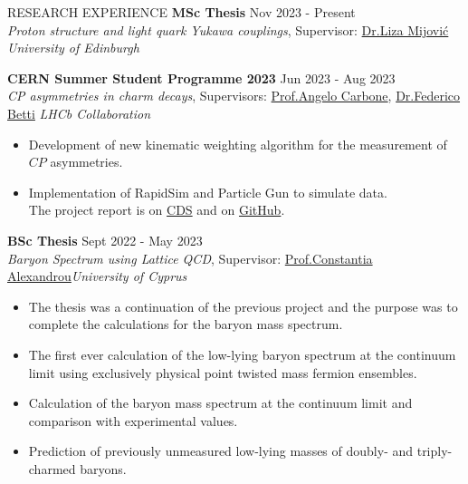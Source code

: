 \documentclass{resume} %
\begin{document}
        \begin{rSection}{RESEARCH EXPERIENCE}
                \textbf{MSc Thesis} \hfill Nov 2023 - Present\\
                {\it Proton structure and light quark Yukawa couplings}, Supervisor: \href{https://www.ph.ed.ac.uk/people/liza-mijovic}{Dr.\@ Liza Mijovi\'c} \hfill \textit{University of Edinburgh}

                \textbf{CERN Summer Student Programme 2023} \hfill Jun 2023 - Aug 2023\\
                {\it CP asymmetries in charm decays}, Supervisors: \href{https://www.unibo.it/sitoweb/angelo.carbone/en}{Prof.\@ Angelo Carbone}, \href{https://www.ph.ed.ac.uk/people/federico-betti}{Dr.\@ Federico Betti}
                \hfill \textit{LHCb Collaboration}
                \begin{itemize}
                        \itemsep -3pt {}
                        \item Development of new kinematic weighting algorithm for the measurement of $CP$ asymmetries.
                        \item Implementation of RapidSim and Particle Gun to simulate data.\\ The project report is on \href{https://cds.cern.ch/record/2866568/}{CDS} and on \href{https://github.com/GiorgosChr/CERN_Summer_Student_Programme_2023}{GitHub}.
                \end{itemize}

                \textbf{BSc Thesis} \hfill Sept 2022 - May 2023\\
                {\it Baryon Spectrum using Lattice QCD}, Supervisor:  \href{https://www.cyi.ac.cy/index.php/castorc/about-the-center/castorc-our-people/itemlist/user/99-constantia-alexandrou.html}{Prof.\@ Constantia Alexandrou}\hfill \textit{University of Cyprus}
                \begin{itemize}
                        \itemsep -3pt {} 
                        \item The thesis was a continuation of the previous project and the purpose was to complete the calculations for the baryon mass spectrum.
                        \item The first ever calculation of the low-lying baryon spectrum at the continuum limit using exclusively physical point twisted mass fermion ensembles.
                        \item Calculation of the baryon mass spectrum at the continuum limit and comparison with experimental values.
                        \item Prediction of previously unmeasured low-lying masses of doubly- and triply-charmed baryons.
                \end{itemize}


\end{rSection}
\end{document}
